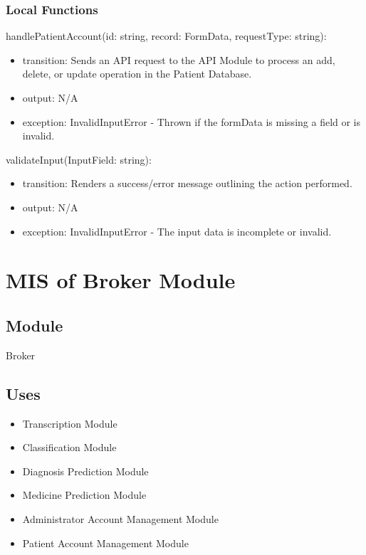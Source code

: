 \documentclass[12pt, titlepage]{article}
\begin{document}
\subsubsection{Local Functions}

\noindent handlePatientAccount(id: string, record: FormData, requestType: string):
\begin{itemize}
\item transition: Sends an API request to the API Module to process an add, delete, or update operation in the Patient Database.
\item output: N/A
\item exception: InvalidInputError - Thrown if the formData is missing a field or is invalid.
\end{itemize}

\noindent validateInput(InputField: string):
\begin{itemize}
\item transition: Renders a success/error message outlining the action performed.
\item output: N/A
\item exception: InvalidInputError - The input data is incomplete or invalid.
\end{itemize}

\newpage

\section{MIS of Broker Module } \label{Module_Broker}

\subsection{Module}
Broker

\subsection{Uses}

\begin{itemize}
  \item Transcription Module
  \item Classification Module
  \item Diagnosis Prediction Module
  \item Medicine Prediction Module
  \item Administrator Account Management Module
  \item Patient Account Management Module
\end{itemize}
\end{document}
